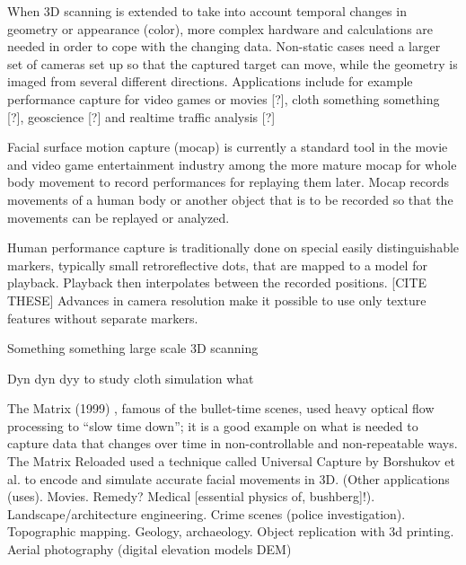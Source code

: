 When 3D scanning is extended to take into account temporal changes in geometry or appearance (color), more complex hardware and calculations are needed in order to cope with the changing data.
Non-static cases need a larger set of cameras set up so that the captured target can move, while the geometry is imaged from several different directions. Applications include for example performance capture for video games or movies [?], cloth something something [?], geoscience [?] and realtime traffic analysis [?]

Facial surface motion capture (mocap) is currently a standard tool in the movie and video game entertainment industry among the more mature mocap for whole body movement to record performances for replaying them later.
Mocap records movements of a human body or another object that is to be recorded so that the movements can be replayed or analyzed.

Human performance capture is traditionally done on special easily distinguishable markers, typically small retroreflective dots, that are mapped to a model for playback. Playback then interpolates between the recorded positions. [CITE THESE] Advances in camera resolution make it possible to use only texture features without separate markers.

Something something large scale 3D scanning 

Dyn dyn dyy to study cloth simulation what

The Matrix (1999) \cite{wachowski99matrix}, famous of the bullet-time scenes, used heavy optical flow processing to ``slow time down''; it is a good example on what is needed to capture data that changes over time in non-controllable and non-repeatable ways. The Matrix Reloaded \cite{wachowski03reloaded} used a technique called Universal Capture by Borshukov et al. \cite{borshukov05universal} to encode and simulate accurate facial movements in 3D.
(Other applications (uses). Movies. Remedy? Medical [essential physics of, bushberg]!). Landscape/architecture engineering. Crime scenes (police investigation). Topographic mapping. Geology, archaeology. Object replication with 3d printing. Aerial photography (digital elevation models DEM)

